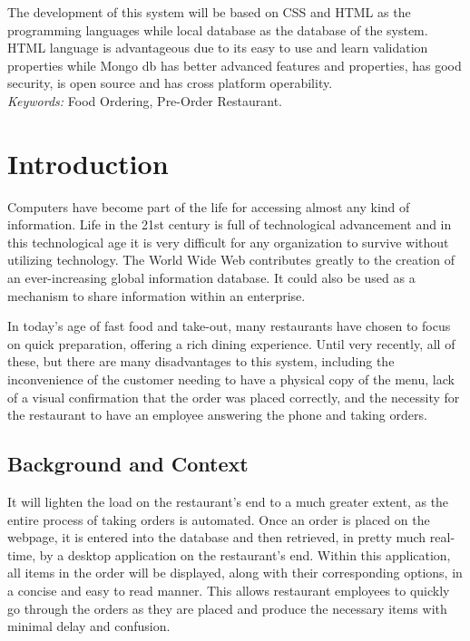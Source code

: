 \documentclass[english]{article}
\begin{document}
The development of this system will be based on CSS and HTML as the programming
languages while local database as the database of the system. HTML language is advantageous
due to its easy to use and learn validation properties while Mongo db has better advanced
features and properties, has good security, is open source and has cross platform operability.\\

\emph {Keywords:} Food Ordering, Pre-Order Restaurant.

\clearpage %

\tableofcontents


\clearpage %

\section{Introduction} %

	Computers have become part of the life for accessing almost any kind of information. Life
in the 21st century is full of technological advancement and in this technological age it is
very difficult for any organization to survive without utilizing technology. The World Wide
Web contributes greatly to the creation of an ever-increasing global information database.
It could also be used as a mechanism to share information within an enterprise.

In today’s age of fast food and take-out, many restaurants have chosen to focus on quick
preparation, offering a rich dining experience. Until very recently, all of these, but there
are many disadvantages to this system, including the inconvenience of the customer needing
to have a physical copy of the menu, lack of a visual confirmation that the order was placed
correctly, and the necessity for the restaurant to have an employee answering the phone and
taking orders.



\subsection{Background and Context}
It will lighten the load on the restaurant’s end to a much greater extent, as the entire process
of taking orders is automated. Once an order is placed on the webpage, it is entered into
the database and then retrieved, in pretty much real-time, by a desktop application on the
restaurant’s end. Within this application, all items in the order will be displayed, along with
their corresponding options, in a concise and easy to read manner. This allows restaurant
employees to quickly go through the orders as they are placed and produce the necessary
items with minimal delay and confusion.
\end{document}
